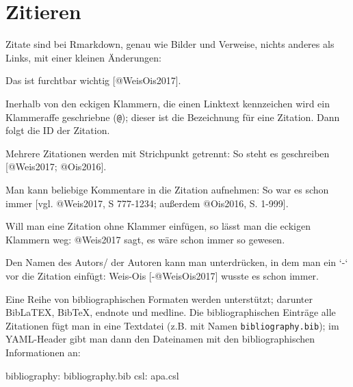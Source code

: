 \documentclass[12pt,]{book}
\newenvironment{Shaded}{\begin{snugshade}}{\end{snugshade}}
\newcommand{\BaseNTok}[1]{\textcolor[rgb]{0.00,0.00,0.81}{{#1}}}
\newcommand{\FunctionTok}[1]{\textcolor[rgb]{0.00,0.00,0.00}{{#1}}}
\newcommand{\NormalTok}[1]{{#1}}
\begin{document}
\section{Zitieren}\label{zitieren}

Zitate sind bei Rmarkdown, genau wie Bilder und Verweise, nichts anderes
als Links, mit einer kleinen Änderungen:

\begin{Shaded}
\begin{Highlighting}[]
\NormalTok{Das ist furchtbar wichtig [@WeisOis2017]. }
\end{Highlighting}
\end{Shaded}

Inerhalb von den eckigen Klammern, die einen Linktext kennzeichen wird
ein Klammeraffe geschriebne (\texttt{@}); dieser ist die Bezeichnung für
eine Zitation. Dann folgt die ID der Zitation.

\begin{Shaded}
\begin{Highlighting}[]
\NormalTok{Mehrere Zitationen werden mit Strichpunkt getrennt: So steht es geschreiben [@Weis2017; @Ois2016].}

\NormalTok{Man kann beliebige Kommentare in die Zitation aufnehmen: So war es schon immer [vgl. @Weis2017, S 777-1234; außerdem @Ois2016, S. 1-999].}

\NormalTok{Will man eine Zitation ohne Klammer einfügen, so lässt man die eckigen Klammern weg: @Weis2017 sagt, es wäre schon immer so gewesen.}

\NormalTok{Den Namen des Autors/ der Autoren kann man unterdrücken, in dem man ein }\BaseNTok{`-`} \NormalTok{vor die Zitation einfügt: Weis-Ois [-@WeisOis2017] wusste es schon immer.}
\end{Highlighting}
\end{Shaded}

Eine Reihe von bibliographischen Formaten werden unterstützt; darunter
BibLaTEX, BibTeX, endnote und medline. Die bibliographischen Einträge
alle Zitationen fügt man in eine Textdatei (z.B. mit Namen
\texttt{bibliography.bib}); im YAML-Header gibt man dann den Dateinamen
mit den bibliographischen Informationen an:

\begin{Shaded}
\begin{Highlighting}[]
\FunctionTok{bibliography:} \NormalTok{bibliography.bib}
\FunctionTok{csl:} \NormalTok{apa.csl}
\end{Highlighting}
\end{Shaded}
\end{document}
